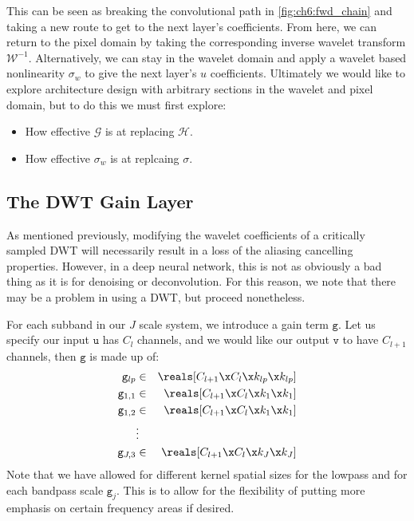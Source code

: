 This can be seen as breaking the convolutional path in
\autoref{fig:ch6:fwd_chain} and taking a new route to get to the next layer's
coefficients. From here, we can return to the pixel domain by taking the
corresponding inverse wavelet transform $\mathcal{W}^{-1}$. Alternatively, we
can stay in the wavelet domain and apply a wavelet based nonlinearity $\sigma_w$
to give the next layer's $u$ coefficients. Ultimately we would like to explore
architecture design with arbitrary sections in the wavelet and pixel domain, but
to do this we must first explore: 
\begin{itemize}
  \item How effective $\mathcal{G}$ is at replacing $\mathcal{H}$.
  \item How effective $\sigma_w$ is at replcaing $\sigma$.
\end{itemize}


\subsection{The DWT Gain Layer}
As mentioned previously, modifying the wavelet coefficients of a critically
sampled DWT will necessarily result in a loss of the aliasing cancelling
properties. However, in a deep neural network, this is not as obviously a bad
thing as it is for denoising or deconvolution. For this reason, we note that
there may be a problem in using a DWT, but proceed nonetheless.

For each subband in our $J$ scale system, we introduce a gain term $\mathtt{g}$. Let us specify our
input $\mathtt{u}$ has $C_l$ channels, and we would like our output $\mathtt{v}$
to have $C_{l+1}$ channels, then $\mathtt{g}$ is made up of:
\begin{eqnarray}
  \mathtt{g}_{lp} &\in& \reals[C_{l+1}\x C_l\x k_{lp}\x k_{lp}] \label{eq:ch6:dwt_gstart} \\
  \mathtt{g}_{1,1} &\in& \reals[C_{l+1}\x C_l\x k_{1}\x k_{1}] \\
  \mathtt{g}_{1,2} &\in& \reals[C_{l+1}\x C_l\x k_{1}\x k_1] \\
      & \vdots &\\
  \mathtt{g}_{J,3} &\in& \reals[C_{l+1}\x C_l\x k_J\x k_J] \label{eq:ch6:dwt_gend}
\end{eqnarray}
%
Note that we have allowed for different kernel spatial sizes for the lowpass and for
each bandpass scale $\mathtt{g}_j$. This is to allow for the flexibility of
putting more emphasis on certain frequency areas if desired.


